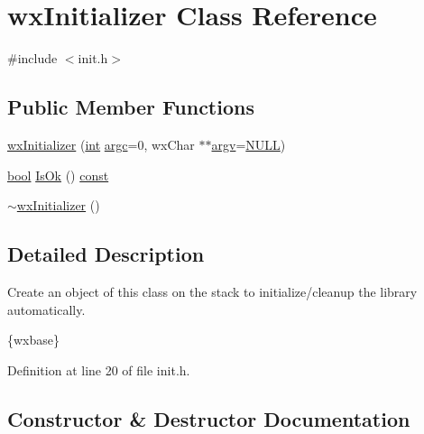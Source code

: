 \hypertarget{classwx_initializer}{}\section{wx\+Initializer Class Reference}
\label{classwx_initializer}


{\ttfamily \#include $<$init.\+h$>$}

\subsection*{Public Member Functions}
\begin{DoxyCompactItemize}
\item 
\hyperlink{classwx_initializer_a7b53997659917e3703a6fe2950fe56a2}{wx\+Initializer} (\hyperlink{xmltok_8h_a5a0d4a5641ce434f1d23533f2b2e6653}{int} \hyperlink{cmdline_8c_aaffeb1bf2056ea44af5b5d0ee4d6ff07}{argc}=0, wx\+Char $\ast$$\ast$\hyperlink{cmdline_8c_ad407d5ba91709bd9b092003858600723}{argv}=\hyperlink{px__mixer_8h_a070d2ce7b6bb7e5c05602aa8c308d0c4}{N\+U\+LL})
\item 
\hyperlink{mac_2config_2i386_2lib-src_2libsoxr_2soxr-config_8h_abb452686968e48b67397da5f97445f5b}{bool} \hyperlink{classwx_initializer_a4014aaf600313c364709893f3833c36e}{Is\+Ok} () \hyperlink{getopt1_8c_a2c212835823e3c54a8ab6d95c652660e}{const} 
\item 
\hyperlink{classwx_initializer_add5bb7958976708e2c8089f79a9ef02c}{$\sim$wx\+Initializer} ()
\end{DoxyCompactItemize}


\subsection{Detailed Description}
Create an object of this class on the stack to initialize/cleanup the library automatically.

\{wxbase\} 

Definition at line 20 of file init.\+h.



\subsection{Constructor \& Destructor Documentation}
